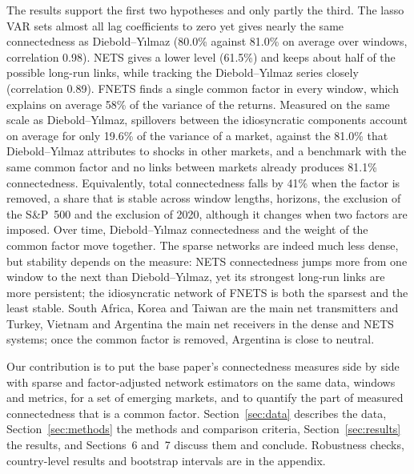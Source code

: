 The results support the first two hypotheses and only partly the third. The lasso VAR sets almost all lag coefficients to zero yet gives nearly the same connectedness as Diebold--Y{\i}lmaz (80.0\% against 81.0\% on average over windows, correlation 0.98). NETS gives a lower level (61.5\%) and keeps about half of the possible long-run links, while tracking the Diebold--Y{\i}lmaz series closely (correlation 0.89). FNETS finds a single common factor in every window, which explains on average 58\% of the variance of the returns. Measured on the same scale as Diebold--Y{\i}lmaz, spillovers between the idiosyncratic components account on average for only 19.6\% of the variance of a market, against the 81.0\% that Diebold--Y{\i}lmaz attributes to shocks in other markets, and a benchmark with the same common factor and no links between markets already produces 81.1\% connectedness. Equivalently, total connectedness falls by 41\% when the factor is removed, a share that is stable across window lengths, horizons, the exclusion of the S\&P~500 and the exclusion of 2020, although it changes when two factors are imposed. Over time, Diebold--Y{\i}lmaz connectedness and the weight of the common factor move together. The sparse networks are indeed much less dense, but stability depends on the measure: NETS connectedness jumps more from one window to the next than Diebold--Y{\i}lmaz, yet its strongest long-run links are more persistent; the idiosyncratic network of FNETS is both the sparsest and the least stable. South Africa, Korea and Taiwan are the main net transmitters and Turkey, Vietnam and Argentina the main net receivers in the dense and NETS systems; once the common factor is removed, Argentina is close to neutral.

Our contribution is to put the base paper's connectedness measures side by side with sparse and factor-adjusted network estimators on the same data, windows and metrics, for a set of emerging markets, and to quantify the part of measured connectedness that is a common factor. Section~\ref{sec:data} describes the data, Section~\ref{sec:methods} the methods and comparison criteria, Section~\ref{sec:results} the results, and Sections~6 and~7 discuss them and conclude. Robustness checks, country-level results and bootstrap intervals are in the appendix.
